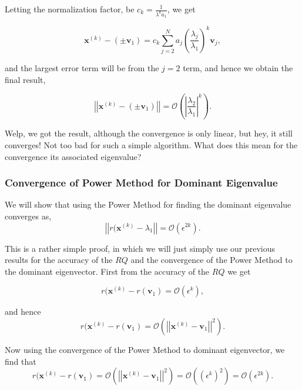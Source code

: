 \documentclass[paper=a4, fontsize=11pt]{scrartcl} %
\numberwithin{equation}{section} %
\numberwithin{figure}{section} %
\numberwithin{table}{section} %
\begin{document}
Letting the normalization factor, be $c_k = \frac{1}{ \lambda^k a_1 }$, we get

$$\textbf{x}^{(k)} - (\pm \textbf{v}_1) = c_k \sum_{j=2}^N a_j \left( \frac{ \lambda_j}{\lambda_1} \right)^k \textbf{v}_j,$$ 

and the largest error term will be from the $j=2$ term, and hence we obtain the final result, 

$$\left|\left| \textbf{x}^{(k)} - (\pm \textbf{v}_1) \right| \right| = \mathcal{O}\left( \left| \frac{\lambda_2}{\lambda_1}  \right|^k  \right).$$

Welp, we got the result, although the convergence is only linear, but hey, it still converges! Not too bad for such a simple algorithm. What does this mean for the convergence its associated eigenvalue? 

%
%
\subsubsection{Convergence of Power Method for Dominant Eigenvalue}

We will show that using the Power Method for finding the dominant eigenvalue converges as, $$\left|\left| r(\textbf{x}^{(k)} - \lambda_1 \right|\right| = \mathcal{O}\left( \epsilon^{2k} \right).$$

This is a rather simple proof, in which we will just simply use our previous results for the accuracy of the $RQ$ and the convergence of the Power Method to the dominant eigenvector. First from the accuracy of the $RQ$ we get 

$$r(\textbf{x}^{(k)} - r(\textbf{v}_1) =  \mathcal{O}\left(\epsilon^k\right),$$

and hence $$r(\textbf{x}^{(k)} - r(\textbf{v}_1) = \mathcal{O}\left( \left|\left| \textbf{x}^{(k)} - \textbf{v}_1   \right|\right|^2  \right).$$

Now using the convergence of the Power Method to dominant eigenvector, we find that $$r(\textbf{x}^{(k)} - r(\textbf{v}_1) = \mathcal{O}\left( \left|\left| \textbf{x}^{(k)} - \textbf{v}_1   \right|\right|^2  \right) = \mathcal{O}\left( \left( \epsilon^k \right) ^2 \right) = \mathcal{O}\left( \epsilon^{2k}  \right).$$
\end{document}

